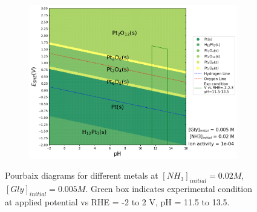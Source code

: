\documentclass[journal=jacsat,manuscript=article]{achemso}
\begin{document}
\begin{figure}[htbp]
    \begin{subfigure}[b]{0.3\textwidth}
        \includegraphics[width=\textwidth]{Figures/pourbaix_diagrams/Pt-NH3-H2O_activity=1e-04_[NH3]=0.02M_[Gly]=0.005M_[CN]=0.png}
        \subcaption{}\label{fig:Pt_Pourbaix_NH3_Gly}
    \end{subfigure}

    \caption{Pourbaix diagrams for different metals at $[NH_3]_{initial}= 0.02M$, $[Gly]_{initial}=0.005M$. Green box indicates experimental condition at applied potential vs RHE = -2 to 2 V, pH = 11.5 to 13.5.}
    \label{fig:Pourbaix_NH3_Gly}
\end{figure}
\end{document}
